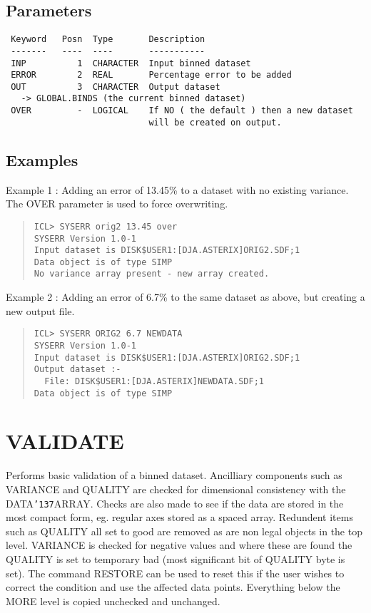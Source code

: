 \documentclass{book}
\renewcommand{\_}{{\tt\char'137}}     %
\begin{document}
\subsection{Parameters}
\begin{verbatim}
 Keyword   Posn  Type       Description
 -------   ----  ----       -----------
 INP          1  CHARACTER  Input binned dataset
 ERROR        2  REAL       Percentage error to be added
 OUT          3  CHARACTER  Output dataset
   -> GLOBAL.BINDS (the current binned dataset)
 OVER         -  LOGICAL    If NO ( the default ) then a new dataset
                            will be created on output.

\end{verbatim}\subsection{Examples}
Example 1 : Adding an error of 13.45\% to a dataset with no
existing variance. The OVER parameter is used to
force overwriting.

\begin{quote}\begin{verbatim}
ICL> SYSERR orig2 13.45 over
SYSERR Version 1.0-1
Input dataset is DISK$USER1:[DJA.ASTERIX]ORIG2.SDF;1
Data object is of type SIMP
No variance array present - new array created.
\end{verbatim}\end{quote}
Example 2 : Adding an error of 6.7\% to the same dataset as above,
but creating a new output file.
\begin{quote}\begin{verbatim}
ICL> SYSERR ORIG2 6.7 NEWDATA
SYSERR Version 1.0-1
Input dataset is DISK$USER1:[DJA.ASTERIX]ORIG2.SDF;1
Output dataset :-
  File: DISK$USER1:[DJA.ASTERIX]NEWDATA.SDF;1
Data object is of type SIMP
\end{verbatim}\end{quote}
\section{VALIDATE}
Performs basic validation of a binned dataset. Ancilliary
components such as VARIANCE and QUALITY are checked for
dimensional consistency with the DATA\_ARRAY. Checks are
also made to see if the data are stored in the most compact
form, eg. regular axes stored as a spaced array. Redundent
items such as QUALITY all set to good are removed as are non
legal objects in the top level. VARIANCE is checked for
negative values and where these are found the QUALITY is
set to temporary bad (most significant bit of QUALITY byte
is set). The command RESTORE can be used to reset this if
the user wishes to correct the condition and use the affected
data points. Everything below the MORE level is copied
unchecked and unchanged.
\end{document}
